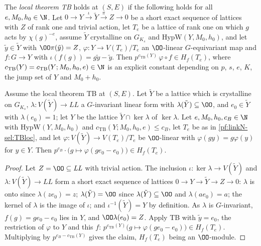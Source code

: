 \begin{definition}\label{pf:linkN-sel:TBloc}
The \emph{local theorem TB} holds at $(S,E)$ if the following holds for all $e,M_0,h_0\in\N$. Let
$0\to Y\xrightarrow{\iota}\tilde Y\xrightarrow{\pi}Z\to0$ be a short exact sequence of lattices with $Z$ of rank one and trivial action, let
$T_e$ be a lattice of rank one on which $g$ acts by $\chi(g)^{-e}$, assume $\tilde Y$ crystalline on $G_{K_s}$ and $\mathrm{HypW}(Y,M_0,h_0)$,
and let $\tilde y\in\tilde Y$ with $\OO\pi(\tilde y)=Z$, $\varphi\colon Y\to V(T_e)/T_e$ an $\OO$-linear $G$-equivariant map and
$f\colon G\to Y$ with $\iota(f(g))=g\tilde y-\tilde y$. Then $p^{c_{\mathrm{TB}}(Y)}\,\varphi\circ f\in H_f(T_e)$, where
$c_{\mathrm{TB}}(Y)=c_{\mathrm{TB}}(Y;M_0,h_0,e)\in\N$ is an explicit constant depending on $p$, $s$, $e$, $K$, the jump set of $Y$ and
$M_0+h_0$.
\end{definition}

\begin{lemma}\label{pf:linkN-sel:tbpart1}
Assume the local theorem TB at $(S,E)$. Let $\tilde Y$ be a lattice which is crystalline on $G_{K_s}$, $\lambda\colon V(\tilde Y)\to\mathit{LL}$ a
$G$-invariant linear form with $\lambda(\tilde Y)\subseteq\OO$, and $e_0\in\tilde Y$ with $\lambda(e_0)=1$; let $Y$ be the lattice
$\tilde Y\cap\ker\lambda$ of $\ker\lambda$. Let $e,M_0,h_0,c_B\in\N$ with $\mathrm{HypW}(Y,M_0,h_0)$ and $c_{\mathrm{TB}}(Y;M_0,h_0,e)\le c_B$,
let $T_e$ be as in \cref{pf:linkN-sel:TBloc}, and let $\varphi\colon V(\tilde Y)\to V(T_e)/T_e$ be $\OO$-linear with
$\varphi(gy)=g\varphi(y)$ for $y\in Y$. Then $p^{c_B}\cdot\bigl(g\mapsto\varphi(ge_0-e_0)\bigr)\in H_f(T_e)$.
\end{lemma}

\begin{proof}
Let $Z=\OO\subseteq\mathit{LL}$ with trivial action. The inclusion $\iota\colon\ker\lambda\to V(\tilde Y)$ and $\lambda\colon V(\tilde Y)\to\mathit{LL}$
form a short exact sequence of lattices $0\to Y\to\tilde Y\to Z\to0$: $\lambda$ is onto since $\lambda(ze_0)=z$; $\lambda(\tilde Y)=\OO$ since
$\lambda(\tilde Y)\subseteq\OO$ and $\lambda(ae_0)=a$; the kernel of $\lambda$ is the image of $\iota$; and $\iota^{-1}(\tilde Y)=Y$ by
definition. As $\lambda$ is $G$-invariant, $f(g)=ge_0-e_0$ lies in $Y$, and $\OO\lambda(e_0)=Z$. Apply TB with $\tilde y=e_0$, the restriction
of $\varphi$ to $Y$ and this $f$: $p^{c_{\mathrm{TB}}(Y)}\bigl(g\mapsto\varphi(ge_0-e_0)\bigr)\in H_f(T_e)$. Multiplying by
$p^{c_B-c_{\mathrm{TB}}(Y)}$ gives the claim, $H_f(T_e)$ being an $\OO$-module.
\end{proof}

